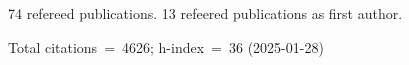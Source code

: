 74 refereed publications. 13 refeered publications as first author.

Total citations~=~4626; h-index~=~36 (2025-01-28)